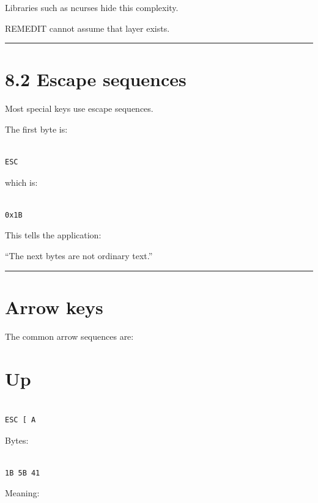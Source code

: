 \documentclass[
  oneside,
  openany]{book}
\begin{document}
Libraries such as ncurses hide this complexity.

REMEDIT cannot assume that layer exists.

\begin{center}\rule{0.5\linewidth}{0.5pt}\end{center}

\hypertarget{escape-sequences-1}{%
\section{8.2 Escape sequences}\label{escape-sequences-1}}

Most special keys use escape sequences.

The first byte is:

\begin{verbatim}

ESC
\end{verbatim}

which is:

\begin{verbatim}

0x1B
\end{verbatim}

This tells the application:

``The next bytes are not ordinary text.''

\begin{center}\rule{0.5\linewidth}{0.5pt}\end{center}

\hypertarget{arrow-keys}{%
\section{Arrow keys}\label{arrow-keys}}

The common arrow sequences are:

\hypertarget{up}{%
\section{Up}\label{up}}

\begin{verbatim}

ESC [ A
\end{verbatim}

Bytes:

\begin{verbatim}

1B 5B 41
\end{verbatim}

Meaning:
\end{document}
